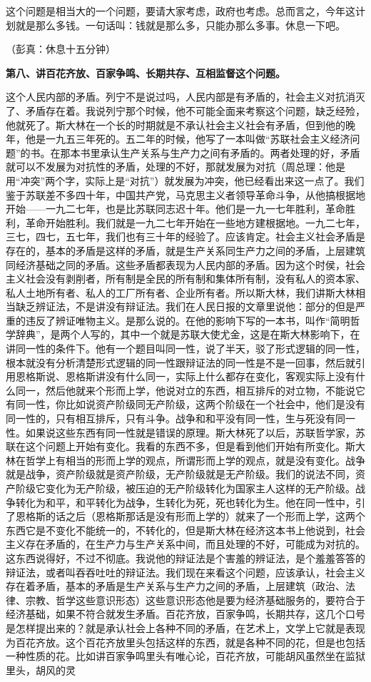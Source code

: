 这个问题是相当大的一个问题，要请大家考虑，政府也考虑。总而言之，今年这计划就是那么多钱。一句话叫：钱就是那么多，只能办那么多事。休息一下吧。

（彭真：休息十五分钟）

\textbf{第八、讲百花齐放、百家争鸣、长期共存、互相监督这个问题。}

这个人民内部的矛盾。列宁不是说过吗，人民内部是有矛盾的，社会主义对抗消灭了、矛盾存在着。我说列宁那个时候，他不可能全面来考察这个问题，缺乏经殓，他就死了。斯大林在一个长的时期就是不承认社会主义社会有矛盾，但到他的晚年，他是一九五三年死的。五二年的时候，他写了一本叫做“苏联社会主义经济问题”的书。在那本书里承认生产关系与生产力之间有矛盾的。两者处理的好，矛盾就可以不发展为对抗性的矛盾，处理的不好，那就发展为对抗（周总理：他是用“冲突”两个字，实际上是“对抗”）就发展为冲突，他已经看出来这一点了。我们鉴于苏联差不多四十年，中国共产党，马克思主义者领导革命斗争，从他搞根据地开始——一九二七年，也是比苏联同志迟十年。他们是一九一七年胜利，革命胜利，革命开始胜利。我们就是一九二七年开始在一些地方建根据地。一九二七年，三七，四七，五七年，我们也有三十年的经验了。应该肯定。社会主义社会矛盾是存在的，基本的矛盾是这样的矛盾，就是生产关系同生产力之间的矛盾，上层建筑同经济基础之同的矛盾。这些矛盾都表现为人民内部的矛盾。因为这个时侯，社会主义社会没有剥削者，所有制是全民的所有制和集体所有制，没有私人的资本家、私人土地所有者、私人的工厂所有者、企业所有者。所以斯大林，我们讲斯大林相当缺乏辨证法，不是讲没有辩证法。我们在人民日报的文章里说他：部分的但是严重的违反了辨证唯物主义。是那么说的。在他的影响下写的一本书，叫作“简明哲学辞典”，是两个人写的，其中一个就是苏联大使尤金，这是在斯大林影响下，在讲同一性的条件下。他有一个题目叫同一性，说了半天，驳了形式逻辑的同一性，根本就没有分析清楚形式逻辑的同一性跟辩证法的同一性是不是一回事，然后就引用恩格斯说、恩格斯讲没有什么同一，实际上什么都存在变化，客观实际上没有什么同一，然后他就来个形而上学，他说对立的东西，相互排斥的对立物，不能说它有同一性，你比如说资产阶级同无产阶级，这两个阶级在一个社会中，他们是没有同一性的，只有相互排斥，只有斗争。战争和和平没有同一性，生与死没有同一性。如果说这些东西有同一性就是错误的原理。斯大林死了以后，苏联哲学家，苏联在这个问题上开始有变化。我看的东西不多，但是看到他们开始有所变化。斯大林在哲学上有相当的形而上学的观点，所谓形而上学的观点，就是没有变化。战争就是战争，资产阶级就是资产阶级，无产阶级就是无产阶级。我们的说法不同，资产阶级它变化为无产阶级，被压迫的无产阶级转化为国家主人这样的无产阶级。战争转化为和平，和平转化为战争，生转化为死，死也转化为生。他在同一性中，引了恩格斯的话之后（恩格斯那话是没有形而上学的）就来了一个形而上学，这两个东西它是不变化不能统一的，不转化的，但是斯大林在经济这本书上他说到，社会主义存在矛盾的，在生产力与生产关系中间，而且处理的不好，可能成为对抗的。这东西说得好，不过不彻底。我说他的辩证法是个害羞的辨证法，是个羞羞答答的辩证法，或者叫吞吞吐吐的辩证法。我们现在来看这个问题，应该承认，社会主义存在着矛盾，基本的矛盾是生产关系与生产力之间的矛盾，上层建筑（政治、法律、宗教、哲学这些意识形态）这些意识形态他是要为经济基础服务的，要符合于经济基础，如果不符合就发生矛盾。百花齐放，百家争鸣，长期共存，这几个口号是怎样提出来的？就是承认社会上各种不同的矛盾，在艺术上，文学上它就是表现为百花齐放。这个百花齐放里头包括这样的东西，就是各种不同的花，但是也包括一种性质的花。比如讲百家争鸣里头有唯心论，百花齐放，可能胡风虽然坐在监狱里头，胡风的灵